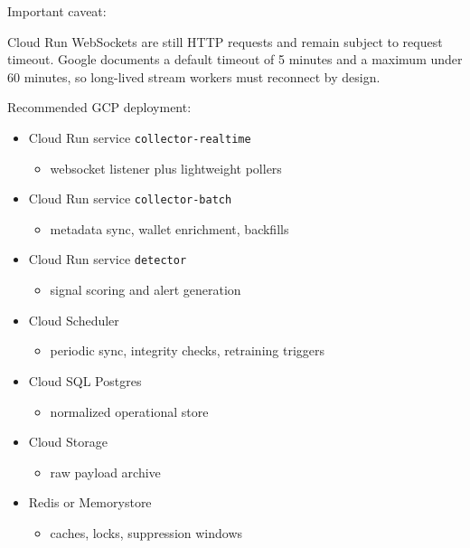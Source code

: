 \documentclass[
]{article}
\providecommand{\tightlist}{%
  \setlength{\itemsep}{0pt}\setlength{\parskip}{0pt}}
\begin{document}
Important caveat:

Cloud Run WebSockets are still HTTP requests and remain subject to
request timeout. Google documents a default timeout of 5 minutes and a
maximum under 60 minutes, so long-lived stream workers must reconnect by
design.

Recommended GCP deployment:

\begin{itemize}
\tightlist
\item
  Cloud Run service \texttt{collector-realtime}

  \begin{itemize}
  \tightlist
  \item
    websocket listener plus lightweight pollers
  \end{itemize}
\item
  Cloud Run service \texttt{collector-batch}

  \begin{itemize}
  \tightlist
  \item
    metadata sync, wallet enrichment, backfills
  \end{itemize}
\item
  Cloud Run service \texttt{detector}

  \begin{itemize}
  \tightlist
  \item
    signal scoring and alert generation
  \end{itemize}
\item
  Cloud Scheduler

  \begin{itemize}
  \tightlist
  \item
    periodic sync, integrity checks, retraining triggers
  \end{itemize}
\item
  Cloud SQL Postgres

  \begin{itemize}
  \tightlist
  \item
    normalized operational store
  \end{itemize}
\item
  Cloud Storage

  \begin{itemize}
  \tightlist
  \item
    raw payload archive
  \end{itemize}
\item
  Redis or Memorystore

  \begin{itemize}
  \tightlist
  \item
    caches, locks, suppression windows
  \end{itemize}
\end{itemize}
\end{document}
